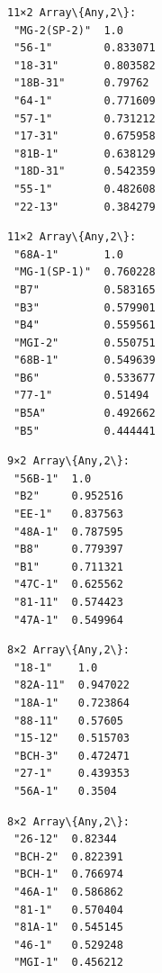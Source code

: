 \documentclass[11pt]{article}
\begin{document}
    \begin{Verbatim}[commandchars=\\\{\}]
11×2 Array\{Any,2\}:
 "MG-2(SP-2)"  1.0
 "56-1"        0.833071
 "18-31"       0.803582
 "18B-31"      0.79762
 "64-1"        0.771609
 "57-1"        0.731212
 "17-31"       0.675958
 "81B-1"       0.638129
 "18D-31"      0.542359
 "55-1"        0.482608
 "22-13"       0.384279
    \end{Verbatim}



    \begin{Verbatim}[commandchars=\\\{\}]
11×2 Array\{Any,2\}:
 "68A-1"       1.0
 "MG-1(SP-1)"  0.760228
 "B7"          0.583165
 "B3"          0.579901
 "B4"          0.559561
 "MGI-2"       0.550751
 "68B-1"       0.549639
 "B6"          0.533677
 "77-1"        0.51494
 "B5A"         0.492662
 "B5"          0.444441
    \end{Verbatim}



    \begin{Verbatim}[commandchars=\\\{\}]
9×2 Array\{Any,2\}:
 "56B-1"  1.0
 "B2"     0.952516
 "EE-1"   0.837563
 "48A-1"  0.787595
 "B8"     0.779397
 "B1"     0.711321
 "47C-1"  0.625562
 "81-11"  0.574423
 "47A-1"  0.549964
    \end{Verbatim}



    \begin{Verbatim}[commandchars=\\\{\}]
8×2 Array\{Any,2\}:
 "18-1"    1.0
 "82A-11"  0.947022
 "18A-1"   0.723864
 "88-11"   0.57605
 "15-12"   0.515703
 "BCH-3"   0.472471
 "27-1"    0.439353
 "56A-1"   0.3504
    \end{Verbatim}



    \begin{Verbatim}[commandchars=\\\{\}]
8×2 Array\{Any,2\}:
 "26-12"  0.82344
 "BCH-2"  0.822391
 "BCH-1"  0.766974
 "46A-1"  0.586862
 "81-1"   0.570404
 "81A-1"  0.545145
 "46-1"   0.529248
 "MGI-1"  0.456212
    \end{Verbatim}


    \begin{center}
    \end{center}
    { \hspace*{\fill} \\}
\end{document}
